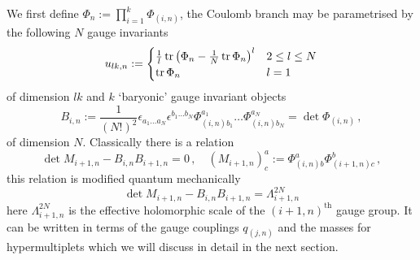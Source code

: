 \documentclass[main.tex]{subfiles}
\begin{document}
We first define $\Phi_n:=\prod_{i=1}^k\Phi_{(i,n)}$, the Coulomb branch may be parametrised by the following $N$ gauge invariants
\begin{equation}\label{eqn:uln}
u_{lk,n}:=\begin{cases}\frac{1}{l}\operatorname{tr}\left(\Phi_n-\frac{1}{N}\operatorname{tr}\Phi_n\right)^l& 2\leq l\leq N\\
\operatorname{tr}\Phi_n&l=1
\end{cases}
\end{equation}
of dimension $lk$ and $k$ `baryonic' gauge invariant objects
\begin{equation}\label{eqn:bin}
B_{i,n}:=\frac{1}{(N!)^2}\epsilon_{{a_1}\dots {a_N}}\epsilon^{{b_{1}}\dots {b_{N}}}\Phi_{(i,n)b_1}^{{a_1}}\dots\Phi_{(i,n)b_N}^{{a_N}}=\det\Phi_{(i,n)}\,,
\end{equation}
of dimension $N$. Classically there is a relation
\begin{equation}\label{eqn:classicalrelation}
\det M_{i+1,n}-B_{i,n}B_{i+1,n}=0\,,\quad (M_{i+1,n})^a_c:=\Phi_{(i,n)b}^{a}\Phi_{(i+1,n)c}^{b}\,,
\end{equation}
this relation is modified quantum mechanically \cite{Seiberg:1994bz} 
\begin{equation}
\det M_{i+1,n}-B_{i,n}B_{i+1,n}=\Lambda^{2N}_{i+1,n}
\end{equation}
here $\Lambda^{2N}_{i+1,n}$ is the effective holomorphic scale of the $(i+1,n)^{\text{th}}$ gauge group. It can be written in terms of the gauge couplings $q_{(j,n)}$ and the masses for hypermultiplets which we will discuss in detail in the next section.
\end{document}
